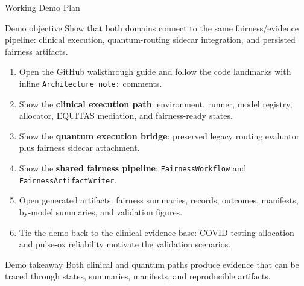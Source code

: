 \documentclass[aspectratio=169,10pt]{beamer}
\begin{document}
\begin{frame}{Working Demo Plan}
\small
\begin{block}{Demo objective}
Show that both domains connect to the same fairness/evidence pipeline: clinical execution, quantum-routing sidecar integration, and persisted fairness artifacts.
\end{block}

\vspace{-0.25em}

\begin{enumerate}
    \item Open the GitHub walkthrough guide and follow the code landmarks with inline \texttt{Architecture note:} comments.
    \item Show the \textbf{clinical execution path}: environment, runner, model registry, allocator, EQUITAS mediation, and fairness-ready states.
    \item Show the \textbf{quantum execution bridge}: preserved legacy routing evaluator plus fairness sidecar attachment.
    \item Show the \textbf{shared fairness pipeline}: \texttt{FairnessWorkflow} and \texttt{FairnessArtifactWriter}.
    \item Open generated artifacts: fairness summaries, records, outcomes, manifests, by-model summaries, and validation figures.
    \item Tie the demo back to the clinical evidence base: COVID testing allocation and pulse-ox reliability motivate the validation scenarios.
\end{enumerate}

\vspace{-0.25em}

\begin{block}{Demo takeaway}
Both clinical and quantum paths produce evidence that can be traced through states, summaries, manifests, and reproducible artifacts.
\end{block}
\end{frame}
\end{document}

